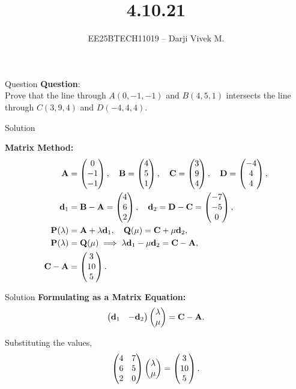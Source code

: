 \documentclass{beamer}
\title{4.10.21}
\author{EE25BTECH11019 -- Darji Vivek M.}
\date{}
\renewcommand{\vec}[1]{\mathbf{#1}}
\begin{document}
\begin{frame}
\titlepage
\end{frame}

\begin{frame}{Question}
\textbf{Question}:\\
Prove that the line through $A(0,-1,-1)$ and $B(4,5,1)$ intersects the line through $C(3,9,4)$ and $D(-4,4,4)$.\\[4pt]
\end{frame}

\begin{frame}{Solution}

\textbf{Matrix Method:}\\
\begin{align}
\vec{A}&=\myvec{0\\-1\\-1},\quad
\vec{B}=\myvec{4\\5\\1},\quad
\vec{C}=\myvec{3\\9\\4},\quad
\vec{D}=\myvec{-4\\4\\4},\\
\vec{d}_1&=\vec{B}-\vec{A}=\myvec{4\\6\\2},\quad
\vec{d}_2=\vec{D}-\vec{C}=\myvec{-7\\-5\\0},\\
\vec{P}(\lambda)&=\vec{A}+\lambda\vec{d}_1,\quad
\vec{Q}(\mu)=\vec{C}+\mu\vec{d}_2,\\
\vec{P}(\lambda)&=\vec{Q}(\mu)\implies 
\lambda\vec{d}_1-\mu\vec{d}_2=\vec{C}-\vec{A},\\
\vec{C}-\vec{A}&=\myvec{3\\10\\5}.
\end{align}
\end{frame}

\begin{frame}{Solution}
\textbf{Formulating as a Matrix Equation:}
\begin{align}
\myvec{\vec{d}_1 & -\vec{d}_2}\myvec{\lambda\\\mu}=\vec{C}-\vec{A}.
\end{align}

Substituting the values,
\begin{align}
\begin{pmatrix}4 & 7\\6 & 5\\2 & 0\end{pmatrix}\begin{pmatrix}\lambda\\\mu\end{pmatrix}=\begin{pmatrix}3\\10\\5\end{pmatrix}.
\end{align}
\end{frame}
\end{document}
